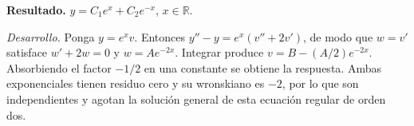\noindent\textbf{Resultado.} $y=C_1e^x+C_2e^{-x}$, $x\in\mathbb R$.

\noindent\textit{Desarrollo.} Ponga $y=e^xv$. Entonces $y''-y=e^x(v''+2v')$, de modo que $w=v'$ satisface $w'+2w=0$ y $w=Ae^{-2x}$. Integrar produce $v=B-(A/2)e^{-2x}$. Absorbiendo el factor $-1/2$ en una constante se obtiene la respuesta. Ambas exponenciales tienen residuo cero y su wronskiano es $-2$, por lo que son independientes y agotan la solución general de esta ecuación regular de orden dos.
